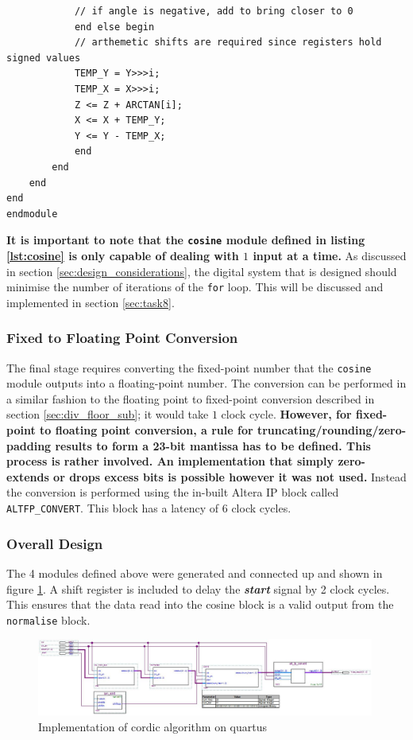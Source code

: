 \documentclass{article}
\begin{document}
\begin{verbatim}
            // if angle is negative, add to bring closer to 0
            end else begin
            // arthemetic shifts are required since registers hold signed values
            TEMP_Y = Y>>>i;
            TEMP_X = X>>>i;
            Z <= Z + ARCTAN[i];
            X <= X + TEMP_Y;
            Y <= Y - TEMP_X;
            end
        end
    end
end
endmodule
\end{verbatim}
\label{lst:cosine}
\newpage
\textbf{It is important to note that the {\tt cosine} module defined in listing \ref{lst:cosine} is only capable of dealing with $1$ input at a time.} As discussed in section \ref{sec:design_considerations}, the digital system that is designed should minimise the number of iterations of the {\tt for} loop. This will be discussed and implemented in section \ref{sec:task8}.

\subsubsection{Fixed to Floating Point Conversion}

The final stage requires converting the fixed-point number that the {\tt cosine} module outputs into a floating-point number. The conversion can be performed in a similar fashion to the floating point to fixed-point conversion described in section \ref{sec:div_floor_sub}; it would take $1$ clock cycle. \textbf{However, for fixed-point to floating point conversion, a rule for truncating/rounding/zero-padding results to form a 23-bit mantissa has to be defined. This process is rather involved. An implementation that simply zero-extends or drops excess bits is possible however it was not used.} Instead the conversion is performed using the in-built Altera IP block called {\tt ALTFP\_CONVERT}. This block has a latency of 6 clock cycles. 

\subsubsection{Overall Design}\label{sec:cordic_design}

The 4 modules defined above were generated and connected up and shown in figure \ref{fig:task7_bdf_1}. A shift register is included to delay the \textbf{\textit{start}} signal by 2 clock cycles. This ensures that the data read into the cosine block is a valid output from the {\tt normalise} block. 

\begin{figure}[H]
    \centering
    \includegraphics[width = 0.99\textwidth]{task7_bdf}
    \caption{Implementation of cordic algorithm on quartus}
    \label{fig:task7_bdf_1}
\end{figure}
\end{document}
